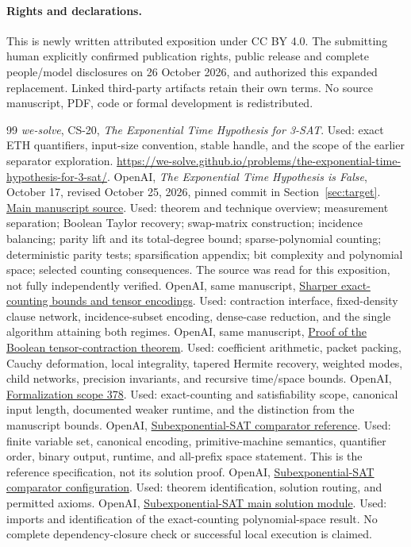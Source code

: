 \documentclass[11pt,a4paper]{article}
\numberwithin{equation}{section}
\theoremstyle{definition}
\theoremstyle{remark}
\newcommand{\repolink}[2]{\href{https://github.com/openai/math/blob/7ef5c0cc5ca4b0e072b7a050fca09ab24bc6fa3a/#1}{#2}}
\newcommand{\cssource}[2]{\repolink{preprints/The-Exponential-Time-Hypothesis-is-False-October-25-2026/build/#1.tex}{#2}}
\begin{document}
\paragraph{Rights and declarations.} This is newly written attributed exposition under CC BY 4.0. The submitting human explicitly confirmed publication rights, public release and complete people/model disclosures on 26 October 2026, and authorized this expanded replacement. Linked third-party artifacts retain their own terms. No source manuscript, PDF, code or formal development is redistributed.

\begin{thebibliography}{99}
 \emph{we-solve}, CS-20,
\emph{The Exponential Time Hypothesis for 3-SAT}.
Used: exact ETH quantifiers, input-size convention, stable handle, and the
scope of the earlier separator exploration.
\url{https://we-solve.github.io/problems/the-exponential-time-hypothesis-for-3-sat/}.
 OpenAI, \emph{The Exponential Time Hypothesis is False},
October 17, revised October 25, 2026, pinned commit in Section~\ref{sec:target}.
\cssource{main_full_version}{Main manuscript source}.
Used: theorem and technique overview; measurement separation; Boolean Taylor
recovery; swap-matrix construction; incidence balancing; parity lift and its
total-degree bound; sparse-polynomial counting; deterministic parity tests;
sparsification appendix; bit complexity and polynomial space; selected
counting consequences. The source was read for this exposition, not fully
independently verified.
 OpenAI, same manuscript,
\cssource{quantitative-reduction}{Sharper exact-counting bounds and tensor encodings}.
Used: contraction interface, fixed-density clause network, incidence-subset
encoding, dense-case reduction, and the single algorithm attaining both regimes.
 OpenAI, same manuscript,
\cssource{quantitative-contraction}{Proof of the Boolean tensor-contraction theorem}.
Used: coefficient arithmetic, packet packing, Cauchy deformation, local
integrality, tapered Hermite recovery, weighted modes, child networks,
precision invariants, and recursive time/space bounds.
 OpenAI,
\repolink{lean/docs/378.md}{Formalization scope 378}.
Used: exact-counting and satisfiability scope, canonical input length,
documented weaker runtime, and the distinction from the manuscript bounds.
 OpenAI,
\repolink{lean/ComparatorChallenges/SubexponentialSAT.lean}{Subexponential-SAT comparator reference}.
Used: finite variable set, canonical encoding, primitive-machine semantics,
quantifier order, binary output, runtime, and all-prefix space statement.
This is the reference specification, not its solution proof.
 OpenAI,
\repolink{lean/ComparatorChallenges/SubexponentialSAT.json}{Subexponential-SAT comparator configuration}.
Used: theorem identification, solution routing, and permitted axioms.
 OpenAI,
\repolink{lean/OAI/Algorithms/SubexponentialSAT/Main.lean}{Subexponential-SAT main solution module}.
Used: imports and identification of the exact-counting polynomial-space result.
No complete dependency-closure check or successful local execution is claimed.
\end{thebibliography}
\end{document}
